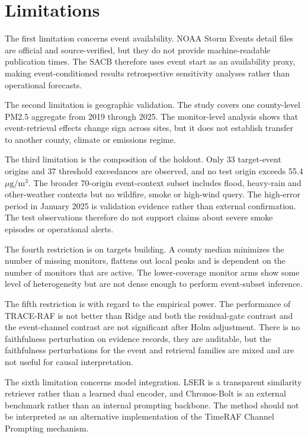 \documentclass{ieeeaccess}
\begin{document}
\section{Limitations}

The first limitation concerns event availability. NOAA Storm Events detail files are official and source-verified, but they do not provide machine-readable publication times. The SACB therefore uses event start as an availability proxy, making event-conditioned results retrospective sensitivity analyses rather than operational forecasts.

The second limitation is geographic validation. The study covers one county-level PM2.5 aggregate from 2019 through 2025. The monitor-level analysis shows that event-retrieval effects change sign across sites, but it does not establish transfer to another county, climate or emissions regime.

The third limitation is the composition of the holdout. Only 33 target-event origins and 37 threshold exceedances are observed, and no test origin exceeds 55.4 $\mu\mathrm{g}/\mathrm{m}^3$. The broader 70-origin event-context subset includes flood, heavy-rain and other-weather contexts but no wildfire, smoke or high-wind query. The high-error period in January 2025 is validation evidence rather than external confirmation. The test observations therefore do not support claims about severe smoke episodes or operational alerts.

The fourth restriction is on targets building. A county median minimizes the number of missing monitors, flattens out local peaks and is dependent on the number of monitors that are active. The lower-coverage monitor arms show some level of heterogeneity but are not dense enough to perform event-subset inference.

The fifth restriction is with regard to the empirical power. The performance of TRACE-RAF is not better than Ridge and both the residual-gate contrast and the event-channel contrast are not significant after Holm adjustment. There is no faithfulness perturbation on evidence records, they are auditable, but the faithfulness perturbations for the event and retrieval families are mixed and are not useful for causal interpretation.

The sixth limitation concerns model integration. LSER is a transparent similarity retriever rather than a learned dual encoder, and Chronos-Bolt is an external benchmark rather than an internal prompting backbone. The method should not be interpreted as an alternative implementation of the TimeRAF Channel Prompting mechanism.
\end{document}
